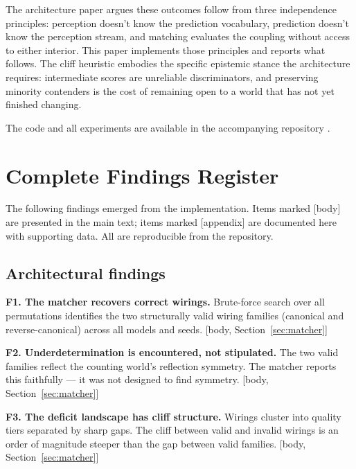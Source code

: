 \documentclass[12pt, a4paper]{article}
\begin{document}
The architecture paper argues these outcomes follow from three independence
principles: perception doesn't know the prediction vocabulary, prediction
doesn't know the perception stream, and matching evaluates the coupling without
access to either interior. This paper implements those principles and reports
what follows. The cliff heuristic embodies the specific epistemic stance the
architecture requires: intermediate scores are unreliable discriminators, and
preserving minority contenders is the cost of remaining open to a world that
has not yet finished changing.

The code and all experiments are available in the accompanying repository
\cite{repo}.

\appendix
\renewcommand{\thesection}{Appendix \Alph{section}}

\section{Complete Findings Register}
\label{app:findings}

The following findings emerged from the implementation. Items marked [body] are
presented in the main text; items marked [appendix] are documented here with
supporting data. All are reproducible from the repository.

\subsection*{Architectural findings}

\noindent\textbf{F1. The matcher recovers correct wirings.}
Brute-force search over all permutations identifies the two structurally valid
wiring families (canonical and reverse-canonical) across all models and seeds.
[body, Section~\ref{sec:matcher}]

\medskip
\noindent\textbf{F2. Underdetermination is encountered, not stipulated.}
The two valid families reflect the counting world's reflection symmetry. The
matcher reports this faithfully --- it was not designed to find symmetry.
[body, Section~\ref{sec:matcher}]

\medskip
\noindent\textbf{F3. The deficit landscape has cliff structure.}
Wirings cluster into quality tiers separated by sharp gaps. The cliff between
valid and invalid wirings is an order of magnitude steeper than the gap between
valid families. [body, Section~\ref{sec:matcher}]
\end{document}
